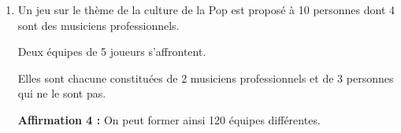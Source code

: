 \begin{enumerate}[itemsep=5mm]
		\medskip

		\textbf{Affirmation 2 :} En arrondissant le résultat au dixième, on a \quad $P(X \leqslant  340) \approx 0,4$.

		\medskip

		\textbf{Affirmation 3 :} En appliquant l'inégalité de Bienaymé-Tchebychev, on peut affirmer qu'il y a plus de $95\,\%$ de chance que, sur cet échantillon de  actifs dans le secteur de la culture, le nombre de musiciens professionnels soit strictement compris entre 230 et 390.

		\item Un jeu sur le thème de la culture de la Pop est proposé à 10 personnes dont 4 sont des musiciens professionnels.

		Deux équipes de 5 joueurs s'affrontent.

		Elles sont chacune constituées de 2 musiciens professionnels et de 3 personnes qui ne le sont pas.

		\textbf{Affirmation 4 :} On peut former ainsi 120 équipes différentes.
	\end{enumerate}
